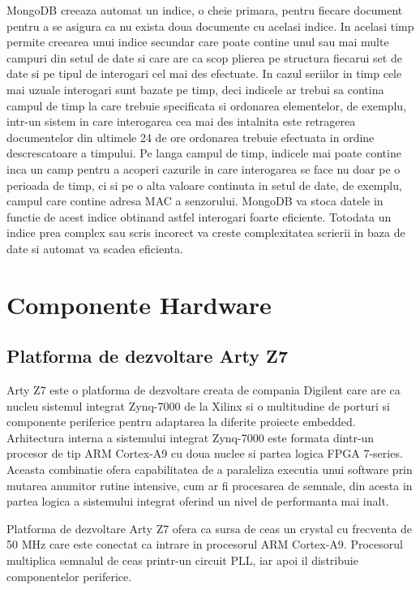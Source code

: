 MongoDB creeaza automat un indice, o cheie primara, pentru fiecare document pentru a se asigura ca nu exista doua documente cu acelasi indice. In acelasi timp 
permite creearea unui indice secundar care poate contine unul sau mai multe campuri din setul de date si care are ca scop plierea pe structura fiecarui set de date 
si pe tipul de interogari cel mai des efectuate. In cazul seriilor in timp cele mai uzuale interogari sunt bazate pe timp, deci indicele ar trebui sa contina campul 
de timp la care trebuie specificata si ordonarea elementelor, de exemplu, intr-un sistem in care interogarea cea mai des intalnita este retragerea documentelor 
din ultimele 24 de ore ordonarea trebuie efectuata in ordine descrescatoare a timpului. Pe langa campul de timp, indicele mai poate contine inca un camp pentru 
a acoperi cazurile in care interogarea se face nu doar pe o perioada de timp, ci si pe o alta valoare continuta in setul de date, de exemplu, campul care contine 
adresa MAC a senzorului. MongoDB va stoca datele in functie de acest indice obtinand astfel interogari foarte eficiente. Totodata un indice prea complex sau 
scris incorect va creste complexitatea scrierii in baza de date si automat va scadea eficienta.

\section{Componente Hardware}\label{sec:af_hw_components}
\subsection{Platforma de dezvoltare Arty Z7}\label{subsec:af_artyz7}
Arty Z7 este o platforma de dezvoltare creata de compania Digilent care are ca nucleu sistemul integrat Zynq-7000 de la Xilinx si o multitudine de porturi si 
componente periferice pentru adaptarea la diferite proiecte embedded. Arhitectura interna a sistemului integrat Zynq-7000 este formata dintr-un procesor de tip 
ARM Cortex-A9 cu doua nuclee si partea logica FPGA 7-series. Aceasta combinatie ofera capabilitatea de a paraleliza executia unui software prin mutarea anumitor 
rutine intensive, cum ar fi procesarea de semnale, din acesta in partea logica a sistemului integrat oferind un nivel de performanta mai inalt.

Platforma de dezvoltare Arty Z7 ofera ca sursa de ceas un crystal cu frecventa de 50 MHz care este conectat ca intrare in procesorul ARM Cortex-A9. Procesorul 
multiplica semnalul de ceas printr-un circuit PLL, iar apoi il distribuie componentelor periferice.

